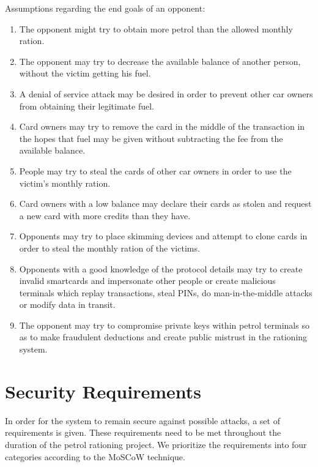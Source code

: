 \documentclass[a4paper,10pt]{llncs}
\begin{document}
Assumptions regarding the end goals of an opponent:
\begin{enumerate}
	\item The opponent might try to obtain more petrol than the allowed monthly ration.
	\item The opponent may try to decrease the available balance of another person, without the victim getting his fuel.
	\item A denial of service attack may be desired in order to prevent other car owners from obtaining their legitimate fuel.
	\item Card owners may try to remove the card in the middle of the transaction in the hopes that fuel may be given without subtracting the fee from the available balance.
	\item People may try to steal the cards of other car owners in order to use the victim's monthly ration.
	\item Card owners with a low balance may declare their cards as stolen and request a new card with more credits than they have.
	\item Opponents may try to place skimming devices and attempt to clone cards in order to steal the monthly ration of the victims.
	\item Opponents with a good knowledge of the protocol details may try to create invalid smartcards and impersonate other people or create malicious terminals which replay transactions, steal PINs, do man-in-the-middle attacks or modify data in transit.
	\item The opponent may try to compromise private keys within petrol terminals so as to make fraudulent deductions and create public mistrust in the rationing system.
\end{enumerate}

\section{Security Requirements}
In order for the system to remain secure against possible attacks, a set of requirements is given. These requirements need to be met throughout the duration of the petrol rationing project. We prioritize the requirements into four categories according to the MoSCoW technique.
\end{document}
